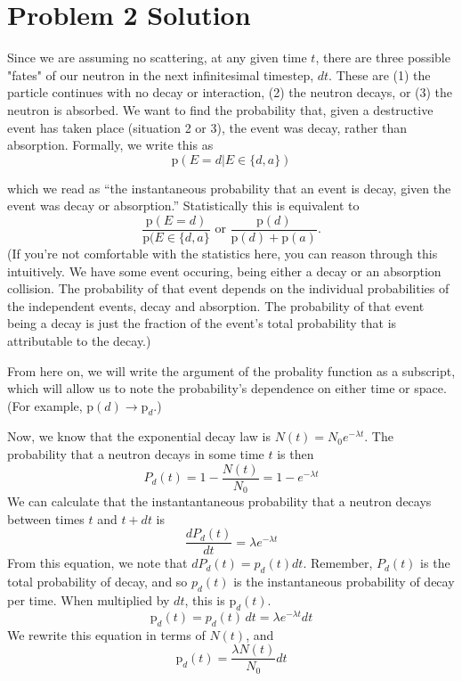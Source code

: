 \documentclass{report}
\begin{document}
\section*{Problem 2 Solution}

Since we are assuming no scattering, at any given time $t$, there are three possible "fates" of our neutron in the next infinitesimal timestep, $dt$. These are (1) the particle continues with no decay or interaction, (2) the neutron decays, or (3) the neutron is absorbed. We want to find the probability that, given a destructive event has taken place (situation 2 or 3), the event was decay, rather than absorption. Formally, we write this as 
$$ \text{p}(E=d | E \in \{d,a\}) $$

which we read as ``the instantaneous probability that an event is decay, given the event was decay or absorption.'' Statistically this is equivalent to
\begin{equation}
\label{prob}
\frac{\text{p}(E=d)}{\text{p}(E \in \{d,a\}} \text{ or } \frac{\text{p}(d)}{\text{p}(d) + \text{p}(a)}.
\end{equation}
(If you're not comfortable with the statistics here, you can reason through this intuitively. We have some event occuring, being either a decay or an absorption collision. The probability of that event depends on the individual probabilities of the independent events, decay and absorption. The probability of that event being a decay is just the fraction of the event's total probability that is attributable to the decay.)

From here on, we will write the argument of the probality function as a subscript, which will allow us to note the probability's dependence on either time or space. (For example, $\text{p}(d) \rightarrow \text{p}_d$.)

Now, we know that the exponential decay law is $N(t) = N_0 e^{-\lambda t}$. The probability that a neutron decays in some time $t$ is then
$$ P_d(t) = 1-\frac{N(t)}{N_0} = 1-e^{-\lambda t} $$
We can calculate that the instantantaneous probability that a neutron decays between times $t$ and $t+dt$ is 
$$ \frac{dP_d(t)}{dt} = \lambda e^{-\lambda t} $$
From this equation, we note that $dP_d(t) = p_d(t)dt$. Remember, $P_d(t)$ is the total probability of decay, and so $p_d(t)$ is the instantaneous probability of decay per time. When multiplied by $dt$, this is $\text{p}_d(t)$.
$$ \text{p}_d(t) = p_d(t) \, dt = \lambda e^{-\lambda t} dt $$
We rewrite this equation in terms of $N(t)$, and  
$$ \text{p}_d(t) = \frac{\lambda N(t)}{N_0} dt$$
\end{document}
